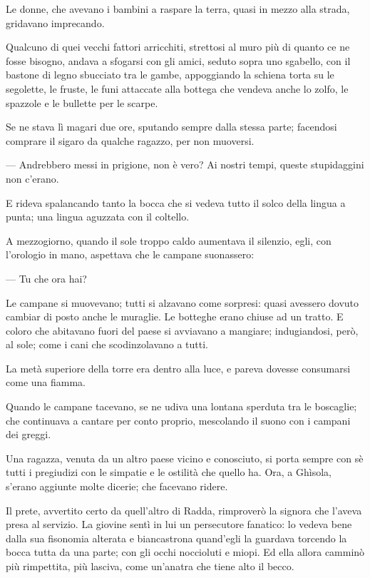 Le donne, che avevano i bambini a raspare la terra, quasi in mezzo alla strada, gridavano imprecando.

Qualcuno di quei vecchi fattori arricchiti, strettosi al muro più di quanto ce ne fosse bisogno, andava a sfogarsi con gli amici, seduto sopra uno sgabello, con il bastone di legno sbucciato tra le gambe, appoggiando la schiena torta su le segolette, le fruste, le funi attaccate alla bottega che vendeva anche lo zolfo, le spazzole e le bullette per le scarpe.

Se ne stava lì magari due ore, sputando sempre dalla stessa parte; facendosi comprare il sigaro da qualche ragazzo, per non muoversi.

— Andrebbero messi in prigione, non è vero? Ai nostri tempi, queste stupidaggini non c’erano.

E rideva spalancando tanto la bocca che si vedeva tutto il solco della lingua a punta; una lingua aguzzata con il coltello.

A mezzogiorno, quando il sole troppo caldo aumentava il silenzio, egli, con l’orologio in mano, aspettava che le campane suonassero:

— Tu che ora hai?

Le campane si muovevano; tutti si alzavano come sorpresi: quasi avessero dovuto cambiar di posto anche le muraglie. Le botteghe erano chiuse ad un tratto. E coloro che abitavano fuori del paese si avviavano a mangiare; indugiandosi, però, al sole; come i cani che scodinzolavano a tutti.

La metà superiore della torre era dentro alla luce, e pareva dovesse consumarsi come una fiamma.

Quando le campane tacevano, se ne udiva una lontana sperduta tra le boscaglie; che continuava a cantare per conto proprio, mescolando il suono con i campani dei greggi.

Una ragazza, venuta da un altro paese vicino e conosciuto, si porta sempre con sè tutti i pregiudizi con le simpatie e le ostilità che quello ha. Ora, a Ghìsola, s’erano aggiunte molte dicerie; che facevano ridere.

Il prete, avvertito certo da quell’altro di Radda, rimproverò la signora che l’aveva presa al servizio. La giovine sentì in lui un persecutore fanatico: lo vedeva bene dalla sua fisonomia alterata e biancastrona quand’egli la guardava torcendo la bocca tutta da una parte; con gli occhi noccioluti e miopi. Ed ella allora camminò più rimpettita, più lasciva, come un’anatra che tiene alto il becco.

